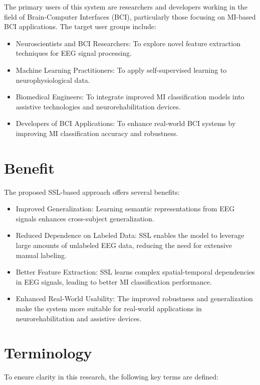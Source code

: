 The primary users of this system are researchers and developers working in the field of Brain-Computer Interfaces (BCI), particularly those focusing on MI-based BCI applications. The target user groups include:

\begin{itemize}
    \item Neuroscientists and BCI Researchers: To explore novel feature extraction techniques for EEG signal processing.
    \item Machine Learning Practitioners: To apply self-supervised learning to neurophysiological data.
    \item Biomedical Engineers: To integrate improved MI classification models into assistive technologies and neurorehabilitation devices.
    \item Developers of BCI Applications: To enhance real-world BCI systems by improving MI classification accuracy and robustness.
\end{itemize}

\section{Benefit}
\label{section:benefit}

The proposed SSL-based approach offers several benefits:
\begin{itemize}
    \item Improved Generalization: Learning semantic representations from EEG signals enhances cross-subject generalization.
    \item Reduced Dependence on Labeled Data: SSL enables the model to leverage large amounts of unlabeled EEG data, reducing the need for extensive manual labeling.
    \item Better Feature Extraction: SSL learns complex spatial-temporal dependencies in EEG signals, leading to better MI classification performance.
    \item Enhanced Real-World Usability: The improved robustness and generalization make the system more suitable for real-world applications in neurorehabilitation and assistive devices.
\end{itemize}

\section{Terminology}
\label{section:terminology}

To ensure clarity in this research, the following key terms are defined:

